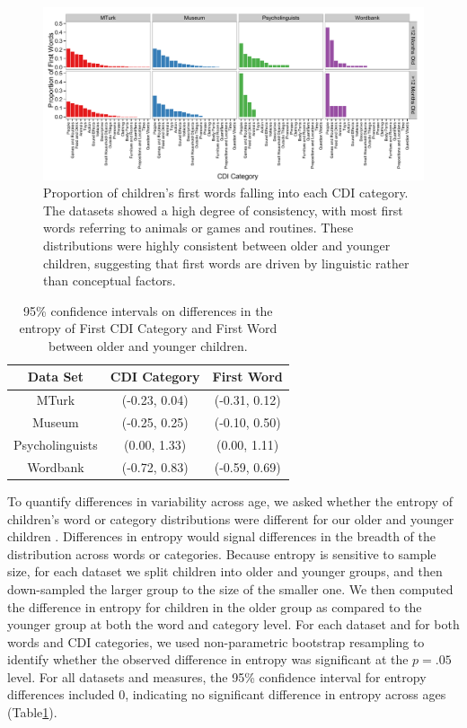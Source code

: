 \documentclass[10pt,letterpaper]{article}
\begin{document}
\begin{figure}[t]
\begin{center}
\includegraphics[width = .9\textwidth]{figures/cdicats_4sets.pdf}
\end{center}
\caption{Proportion of children's first words falling into each CDI category. The datasets showed a high degree of consistency, with most first words referring to animals or games and routines. These distributions were highly consistent between older and younger children, suggesting that first words are driven by linguistic rather than conceptual factors.}
\label{fig:cdi_cats}
\vspace{-1em}
\end{figure}


\begin{table}[tb]
\centering
\begin{tabular}{ccc}
\hline
Data Set & CDI Category & First Word \\ 
  \hline
  MTurk & (-0.23, 0.04) & (-0.31, 0.12) \\ 
  Museum & (-0.25, 0.25) & (-0.10, 0.50) \\ 
  Psycholinguists & (0.00, 1.33) & (0.00, 1.11) \\ 
  Wordbank & (-0.72, 0.83) & (-0.59, 0.69) \\ 
   \hline
\end{tabular}
\caption{\label{tab:ent_diffs} 95\% confidence intervals on differences in the entropy of First CDI Category and First Word between older and younger children.}
\vspace{-1em}
\end{table}

To quantify differences in variability across age, we asked whether the entropy of children's word or category distributions were different for our older and younger children \cite{shannon1948}. Differences in entropy would signal differences in the breadth of the distribution across words or categories. Because entropy is sensitive to sample size, for each dataset we split children into older and younger groups, and then down-sampled the larger group to the size of the smaller one. We then computed the difference in entropy for children in the older group as compared to the younger group at both the word and category level. For each dataset and for both words and CDI categories, we used non-parametric bootstrap resampling to identify whether the observed difference in entropy was significant at the $p = .05$ level. For all datasets and measures, the 95\% confidence interval for entropy differences included 0, indicating no significant difference in entropy across ages (Table\ref{tab:ent_diffs}).
\end{document}
